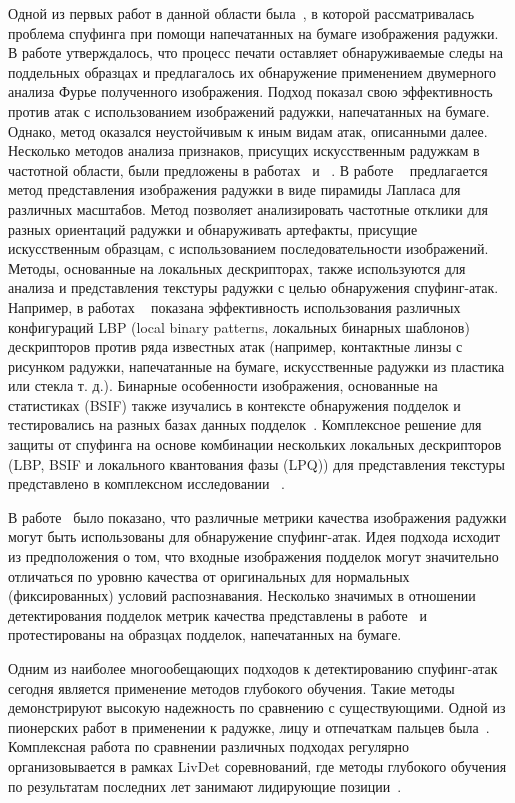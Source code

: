 Одной из первых работ в данной области была~\cite{daugman_antispoofing_2004}, в которой рассматривалась проблема спуфинга при помощи напечатанных на бумаге изображения радужки. В работе утверждалось, что процесс печати оставляет обнаруживаемые следы на поддельных образцах и предлагалось их обнаружение применением двумерного анализа Фурье полученного изображения. Подход показал свою эффективность против атак с использованием изображений радужки, напечатанных на бумаге. Однако, метод оказался неустойчивым к иным видам атак, описанными далее. Несколько методов анализа признаков, присущих искусственным радужкам в частотной области, были предложены в работах~\cite{he_2008} и ~\cite{czajka_2013}. В работе ~\cite{raja_2015} предлагается метод представления изображения радужки в виде пирамиды Лапласа для различных масштабов. Метод позволяет анализировать частотные отклики для разных ориентаций радужки и обнаруживать артефакты, присущие искусственным образцам, с использованием последовательности изображений. Методы, основанные на локальных дескрипторах, также используются для анализа и представления текстуры радужки с целью обнаружения спуфинг-атак. Например, в работах ~\cite{he_2008,gupta_2014} показана эффективность использования различных конфигураций LBP (local binary patterns, локальных бинарных шаблонов) дескрипторов против ряда известных атак (например, контактные линзы с рисунком радужки, напечатанные на бумаге, искусственные радужки из пластика или стекла т. д.). Бинарные особенности изображения, основанные на статистиках (BSIF) также изучались в контексте обнаружения подделок и тестировались на разных базах данных подделок~\cite{raghavendra_2015}. Комплексное решение для защиты от спуфинга на основе комбинации нескольких локальных дескрипторов (LBP, BSIF и локального квантования фазы (LPQ)) для представления текстуры представлено в комплексном исследовании ~\cite{gragnaniello_2015}.

В работе~\cite{galbally_2012} было показано, что различные метрики качества изображения радужки могут быть использованы для обнаружение спуфинг-атак. Идея подхода исходит из предположения о том, что входные изображения подделок могут значительно отличаться по уровню качества от оригинальных для нормальных (фиксированных) условий распознавания. Несколько значимых в отношении детектирования подделок метрик качества представлены в работе~\cite{galbally_2012} и протестированы на образцах подделок, напечатанных на бумаге.

Одним из наиболее многообещающих подходов к детектированию спуфинг-атак сегодня является применение методов глубокого обучения. Такие методы демонстрируют высокую надежность по сравнению с существующими. Одной из пионерских работ в применении к радужке, лицу и отпечаткам пальцев была~\cite{menotti_2015}. Комплексная работа по сравнении различных подходах регулярно организовывается в рамках LivDet соревнований, где методы глубокого обучения по результатам последних лет занимают лидирующие позиции~\cite{livdet_2013,livdet_2015,livdet_2017}.

